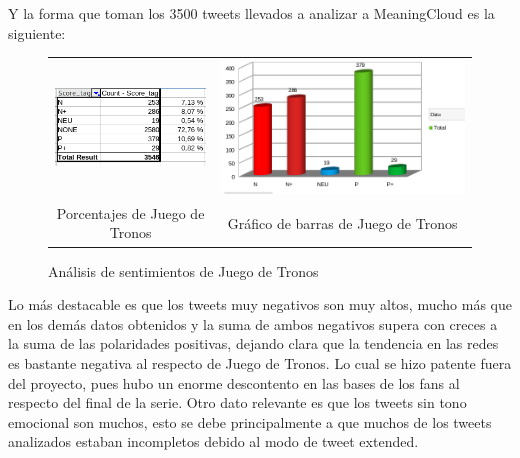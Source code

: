 Y la forma que toman los 3500 tweets llevados a analizar a MeaningCloud es la siguiente:

\begin{figure}[H]
	\centering
	\begin{tabular}{c c}
		
		\includegraphics[scale=.6]{imagenes/porcentajeJdT.png}
		&  \includegraphics[scale=.4]{imagenes/barraJdt.png} \\ 
		
		{Porcentajes de Juego de Tronos}
		
		&  {Gráfico de barras de Juego de Tronos} \\ 
		
	\end{tabular} 
	\caption{Análisis de sentimientos de Juego de Tronos}
	\label{fig:HBOAll}
\end{figure}

Lo más destacable es que los tweets muy negativos son muy altos, mucho más que en los demás datos obtenidos y la suma de ambos negativos supera con creces a la suma de las polaridades positivas, dejando clara que la tendencia en las redes es bastante negativa al respecto de Juego de Tronos. Lo cual se hizo patente fuera del proyecto, pues hubo un enorme descontento en las bases de los fans al respecto del final de la serie. Otro dato relevante es que los tweets sin tono emocional son muchos, esto se debe principalmente a que muchos de los tweets analizados estaban incompletos debido al modo de tweet extended. 
